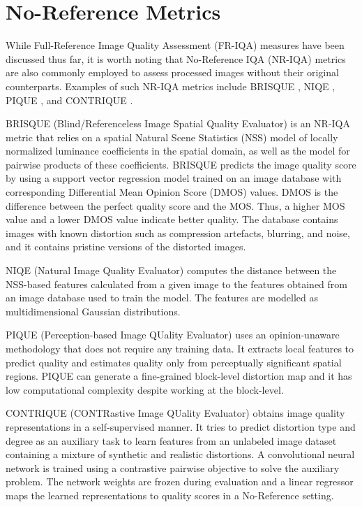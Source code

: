 \section{No-Reference Metrics}
\label{sec:no-reference-metrics}
While Full-Reference Image Quality Assessment (FR-IQA) measures have been discussed thus far, it is worth noting that No-Reference IQA (NR-IQA) metrics are also commonly employed to assess processed images without their original counterparts. Examples of such NR-IQA metrics include BRISQUE \cite{mittal2012no}, NIQE \cite{mittal2012making}, PIQUE \cite{venkatanath2015blind}, and CONTRIQUE \cite{madhusudana2022image}.

BRISQUE (Blind/Referenceless Image Spatial Quality Evaluator) is an NR-IQA metric that relies on a spatial Natural Scene Statistics (NSS) model \cite{ruderman1994statistics} of locally normalized luminance coefficients in the spatial domain, as well as the model for pairwise products of these coefficients. BRISQUE predicts the image quality score by using a support vector regression model trained on an image database with corresponding Differential Mean Opinion Score (DMOS) values. DMOS is the difference between the perfect quality score and the MOS. Thus, a higher MOS value and a lower DMOS value indicate better quality. The database contains images with known distortion such as compression artefacts, blurring, and noise, and it contains pristine versions of the distorted images.

NIQE (Natural Image Quality Evaluator) computes the distance between the NSS-based features calculated from a given image to the features obtained from an image database used to train the model. The features are modelled as multidimensional Gaussian distributions.

PIQUE (Perception-based Image QUality Evaluator) uses an opinion-unaware methodology that does not require any training data. It extracts local features to predict quality and estimates quality only from perceptually significant spatial regions. PIQUE can generate a fine-grained block-level distortion map and it has low computational complexity despite working at the block-level.

CONTRIQUE (CONTRastive Image QUality Evaluator) obtains image quality representations in a self-supervised manner. It tries to predict distortion type and degree as an auxiliary task to learn features from an unlabeled image dataset containing a mixture of synthetic and realistic distortions. A convolutional neural network is trained using a contrastive pairwise objective to solve the auxiliary problem. The network weights are frozen during evaluation and a linear regressor maps the learned representations to quality scores in a No-Reference setting.

